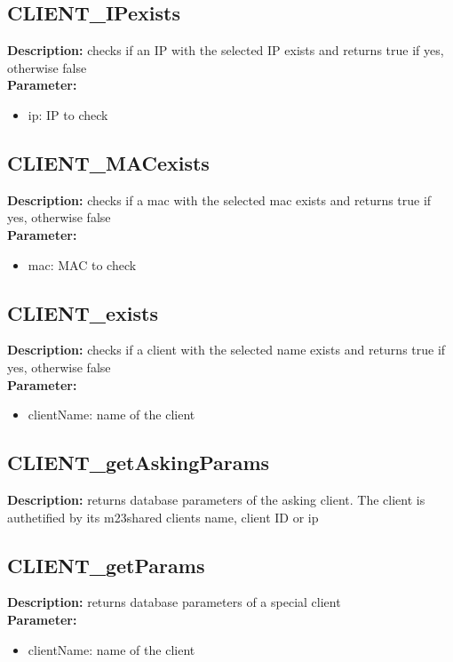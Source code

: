 \subsection{CLIENT\_IPexists}
\textbf{Description:} checks if an IP with the selected IP exists and returns true if yes, otherwise false\\
\textbf{Parameter:}
\begin{itemize}
\item ip: IP to check
\end{itemize}

\subsection{CLIENT\_MACexists}
\textbf{Description:} checks if a mac with the selected mac exists and returns true if yes, otherwise false\\
\textbf{Parameter:}
\begin{itemize}
\item mac: MAC to check
\end{itemize}

\subsection{CLIENT\_exists}
\textbf{Description:} checks if a client with the selected name exists and returns true if yes, otherwise false\\
\textbf{Parameter:}
\begin{itemize}
\item clientName: name of the client
\end{itemize}

\subsection{CLIENT\_getAskingParams}
\textbf{Description:} returns database parameters of the asking client. The client is authetified by its m23shared clients name, client ID or ip\\

\subsection{CLIENT\_getParams}
\textbf{Description:} returns database parameters of a special client\\
\textbf{Parameter:}
\begin{itemize}
\item clientName: name of the client
\end{itemize}

